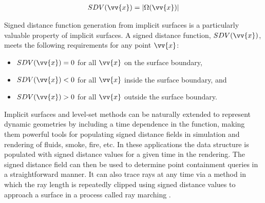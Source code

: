 \begin{align} \label{eq:sdf}
   SDV(\vv{x}) = |\Omega(\vv{x})|
\end{align}

Signed distance function generation from implicit surfaces is a
particularly valuable property of implicit surfaces. A signed distance
function, $SDV(\vv{x})$, meets the following requirements
for any point $\vv{x}$:

\begin{itemize}
\item $ SDV(\vv{x}) = 0 $ for all $ \vv{x} $ on the surface boundary,
\item $ SDV(\vv{x}) < 0 $ for all $\vv{x}$ inside the surface boundary, and
\item $ SDV(\vv{x}) > 0 $ for all $\vv{x}$ outside the surface boundary.
\end{itemize}

Implicit surfaces and level-set methods can be naturally extended to
represent dynamic geometries by including a time dependence in the
function, making them powerful tools for populating signed distance
fields in simulation and rendering of fluids, smoke, fire, etc. In
these applications the data structure is populated with signed
distance values for a given time in the rendering. The signed distance
field can then be used to determine point containment queries in a
straightforward manner. It can also trace rays at any time via a
method in which the ray length is repeatedly clipped using signed
distance values to approach a surface in a process called ray marching
\cite{Tomczak_2012}.
